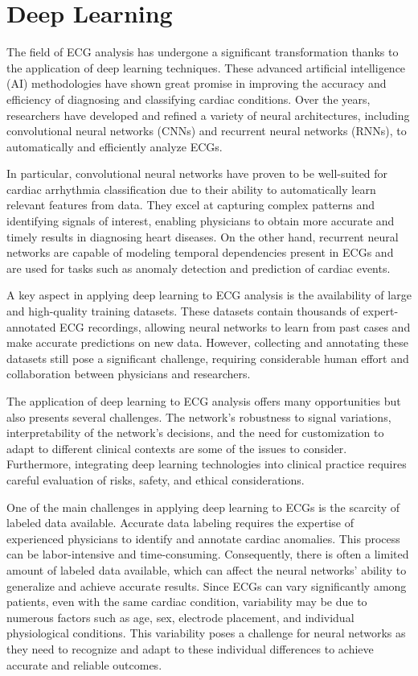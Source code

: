 \documentclass[12pt,italian]{report}
\begin{document}
\section{Deep Learning}
\label{sec:deep}

The field of ECG analysis has undergone a significant transformation thanks to the application of deep learning techniques. These advanced artificial intelligence (AI) methodologies have shown great promise in improving the accuracy and efficiency of diagnosing and classifying cardiac conditions. Over the years, researchers have developed and refined a variety of neural architectures, including convolutional neural networks (CNNs) and recurrent neural networks (RNNs), to automatically and efficiently analyze ECGs.

In particular, convolutional neural networks have proven to be well-suited for cardiac arrhythmia classification due to their ability to automatically learn relevant features from data. They excel at capturing complex patterns and identifying signals of interest, enabling physicians to obtain more accurate and timely results in diagnosing heart diseases. On the other hand, recurrent neural networks are capable of modeling temporal dependencies present in ECGs and are used for tasks such as anomaly detection and prediction of cardiac events.

A key aspect in applying deep learning to ECG analysis is the availability of large and high-quality training datasets. These datasets contain thousands of expert-annotated ECG recordings, allowing neural networks to learn from past cases and make accurate predictions on new data. However, collecting and annotating these datasets still pose a significant challenge, requiring considerable human effort and collaboration between physicians and researchers.

The application of deep learning to ECG analysis offers many opportunities but also presents several challenges. The network's robustness to signal variations, interpretability of the network's decisions, and the need for customization to adapt to different clinical contexts are some of the issues to consider. Furthermore, integrating deep learning technologies into clinical practice requires careful evaluation of risks, safety, and ethical considerations.

One of the main challenges in applying deep learning to ECGs is the scarcity of labeled data available. Accurate data labeling requires the expertise of experienced physicians to identify and annotate cardiac anomalies. This process can be labor-intensive and time-consuming. Consequently, there is often a limited amount of labeled data available, which can affect the neural networks' ability to generalize and achieve accurate results. Since ECGs can vary significantly among patients, even with the same cardiac condition, variability may be due to numerous factors such as age, sex, electrode placement, and individual physiological conditions. This variability poses a challenge for neural networks as they need to recognize and adapt to these individual differences to achieve accurate and reliable outcomes.
\end{document}

